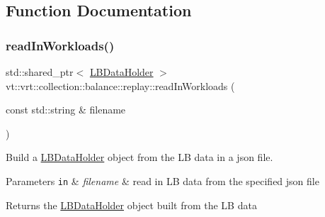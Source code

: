 \subsection{Function Documentation}
\mbox{\label{namespacevt_1_1vrt_1_1collection_1_1balance_1_1replay_a2177c340e50c514aa567bde597a58139}} 
\subsubsection{\texorpdfstring{read\+In\+Workloads()}{readInWorkloads()}}
{\footnotesize\ttfamily std\+::shared\+\_\+ptr$<$ \hyperlink{structvt_1_1vrt_1_1collection_1_1balance_1_1_l_b_data_holder}{L\+B\+Data\+Holder} $>$ vt\+::vrt\+::collection\+::balance\+::replay\+::read\+In\+Workloads (\begin{DoxyParamCaption}\item[{const std\+::string \&}]{filename }\end{DoxyParamCaption})}



Build a \hyperlink{structvt_1_1vrt_1_1collection_1_1balance_1_1_l_b_data_holder}{L\+B\+Data\+Holder} object from the LB data in a json file. 


\begin{DoxyParams}[1]{Parameters}
\mbox{\tt in}  & {\em filename} & read in LB data from the specified json file\\
\hline
\end{DoxyParams}
\begin{DoxyReturn}{Returns}
the \hyperlink{structvt_1_1vrt_1_1collection_1_1balance_1_1_l_b_data_holder}{L\+B\+Data\+Holder} object built from the LB data 
\end{DoxyReturn}
\mbox{\label{namespacevt_1_1vrt_1_1collection_1_1balance_1_1replay_a4923aa281087b1b8c161372c1742be4e}} 
